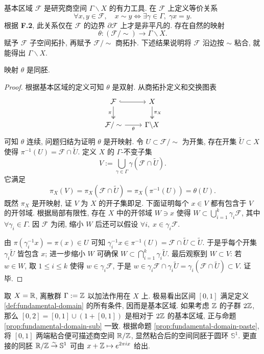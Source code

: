 基本区域 $\mathcal{F}$ 是研究商空间 $\Gamma \backslash X$ 的有力工具. 在 $\mathcal{F}$ 上定义等价关系
\[ \forall x,y \in \mathcal{F}, \quad x \sim y \iff \exists \gamma \in \Gamma, \; \gamma x = y. \]
根据 \textbf{F.2}, 此关系仅在 $\mathcal{F}$ 的边界 $\partial \mathcal{F}$ 上才是非平凡的. 存在自然的映射
\[ \theta: (\mathcal{F}/\sim) \longrightarrow \Gamma \backslash X. \]
赋予 $\mathcal{F}$ 子空间拓扑, 再赋予 $\mathcal{F}/\sim$ 商拓扑. 下述结果说明将 $\mathcal{F}$ 沿边按 $\sim$ 粘合, 就能得出 $\Gamma\backslash X$.
\begin{proposition}\label{prop:fundamental-domain-paste}
	映射 $\theta$ 是同胚.
\end{proposition}
\begin{proof}
	根据基本区域的定义可知 $\theta$ 是双射. 从商拓扑定义和交换图表
	\[\begin{tikzcd}
		\mathcal{F} \arrow[d, twoheadrightarrow, "\pi"'] \arrow[r, hookrightarrow] & X \arrow[d, twoheadrightarrow, "\pi_X"] \\
		\mathcal{F}/\sim \arrow[r, "\theta"'] & \Gamma\backslash X
	\end{tikzcd}\]
	可知 $\theta$ 连续, 问题归结为证明 $\theta$ 是开映射. 令 $U \subset \mathcal{F}/\sim$ 为开集, 存在开集 $\tilde{U} \subset X$ 使得 $\pi^{-1}(U) = \mathcal{F} \cap \tilde{U}$. 定义 $X$ 的 $\Gamma$-不变子集
	\[ V := \bigcup_{\gamma \in \Gamma} \gamma (\mathcal{F} \cap \tilde{U}). \]
	它满足
	\[ \pi_X(V) = \pi_X(\mathcal{F} \cap \tilde{U}) = \pi_X(\pi^{-1}(U)) = \theta(U). \]
	既然 $\pi_X$ 是开映射, 证 $V$ 为 $X$ 的开子集即足. 下面证明每个 $x \in V$ 都有包含于 $V$ 的开邻域. 根据局部有限性, 存在 $X$ 中的开邻域 $W \ni x$ 使得 $W \subset \bigcup_{i=1}^k \gamma_i \mathcal{F}$, 其中 $\forall \gamma_i \in \Gamma$. 因 $\mathcal{F}$ 为闭, 缩小 $W$ 后还可以假设 $\forall i, \; x \in \gamma_i\mathcal{F}$.
	
	由 $\pi(\gamma_i^{-1} x) = \pi(x) \in U$ 可知 $\gamma_i^{-1}x \in \pi^{-1}(U) = \mathcal{F} \cap \tilde{U} \subset \tilde{U}$. 于是乎每个开集 $\gamma_i \tilde{U}$ 皆包含 $x$; 进一步缩小 $W$ 可确保 $W \subset \bigcap_{i=1}^k \gamma_i \tilde{U}$. 最后观察到 $W \subset V$: 若 $w \in W$, 取 $1 \leq i \leq k$ 使得 $w \in \gamma_i \mathcal{F}$, 于是 $w \in \gamma_i \mathcal{F} \cap \gamma_i\tilde{U} = \gamma_i(\mathcal{F} \cap \tilde{U}) \subset V$. 证毕.
\end{proof}

\begin{example}
	取 $X = \mathbb{R}$, 离散群 $\Gamma := \mathbb{Z}$ 以加法作用在 $X$ 上. 极易看出区间 $[0,1]$ 满足定义 \ref{def:fundamental-domain} 的所有条件, 因而是基本区域. 如果考虑 $\mathbb{Z}$ 的子群 $2\mathbb{Z}$, 那么 $[0,2] = [0,1] \cup (1 + [0,1])$ 是相对于 $2\mathbb{Z}$ 的基本区域, 正与命题 \ref{prop:fundamental-domain-sub} 一致. 根据命题 \ref{prop:fundamental-domain-paste}, 将 $[0,1]$ 两端粘合便可描述商空间 $\mathbb{R}/\mathbb{Z}$, 显然粘合后的空间同胚于圆环 $\mathbb{S}^1$. 更直接的同胚 $\mathbb{R}/\mathbb{Z} \stackrel{\sim}{\rightarrow} \mathbb{S}^1$ 可由 $x + \mathbb{Z} \mapsto e^{2\pi ix}$ 给出.
\end{example}

